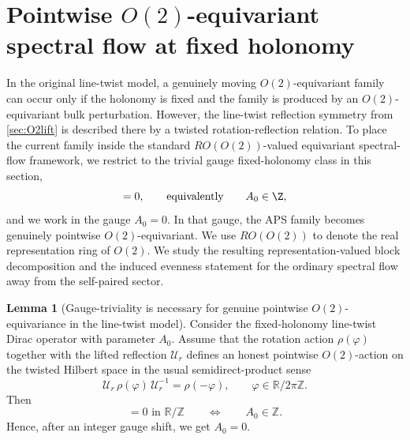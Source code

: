 \documentclass[11pt]{article}
\theoremstyle{definition}
\newtheorem{lemma}[theorem]{Lemma}
\numberwithin{equation}{section}
\begin{document}
\section{Pointwise \texorpdfstring{$O(2)$}{O(2)}-equivariant spectral flow at fixed holonomy}
\label{sec:O2_sf}


In the original line-twist model, a genuinely moving \(O(2)\)-equivariant family can occur only if the holonomy is fixed and the family is produced by an \(O(2)\)-equivariant bulk perturbation. However, the line-twist reflection symmetry from \autoref{sec:O2lift} is described there by a twisted rotation-reflection relation. To place the current family inside the standard \(RO(O(2))\)-valued equivariant spectral-flow framework, we restrict to the trivial gauge fixed-holonomy class in this section,
\begin{equation}
[A_0]=0,
\qquad\text{equivalently}\qquad
A_0\in\Z,
\end{equation}
and we work in the gauge \(A_0=0\). In that gauge, the APS family becomes genuinely pointwise \(O(2)\)-equivariant. We use \(RO(O(2))\) to denote the real representation ring of \(O(2)\). We study the resulting representation-valued block decomposition and the induced evenness statement for the ordinary spectral flow away from the self-paired sector.


\begin{lemma}[Gauge-triviality is necessary for genuine pointwise $O(2)$-equivariance in the line-twist model]
\label{lem:gauge_triviality_necessary}
Consider the fixed-holonomy line-twist Dirac operator with parameter \(A_0\).
Assume that the rotation action \(\rho(\varphi)\) together with the lifted reflection
\(\mathcal U_r\) defines an honest pointwise \(O(2)\)-action on the twisted Hilbert space in the
usual semidirect-product sense
\begin{equation}
\mathcal U_r\,\rho(\varphi)\,\mathcal U_r^{-1}=\rho(-\varphi),
\qquad
\varphi\in \mathbb R/2\pi\mathbb Z.
\end{equation}
Then
\begin{equation}
[A_0]=0 \text{ in } \mathbb R/\mathbb Z
\qquad\Longleftrightarrow\qquad
A_0\in \mathbb Z.
\end{equation}
Hence, after an integer gauge shift, we get \(A_0=0\).
\end{lemma}
\end{document}
